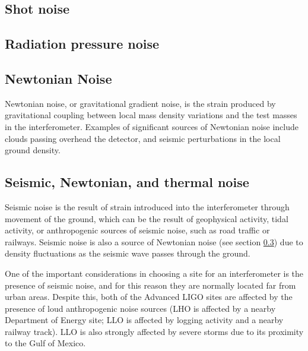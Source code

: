 
\subsection{Shot noise}
\label{sec:shot-noise}

\subsection{Radiation pressure noise}
\label{sec:radi-press-noise}


\subsection{Newtonian Noise}
\label{sec:newtonian-noise}

Newtonian noise, or gravitational gradient noise, is the strain
produced by gravitational coupling between local mass density
variations and the test masses in the interferometer. Examples of
significant sources of Newtonian noise include clouds passing overhead
the detector, and seismic perturbations in the local ground density.

\subsection{Seismic, Newtonian, and thermal noise}
\label{sec:seismic-noise}

Seismic noise is the result of strain introduced into the
interferometer through movement of the ground, which can be the result
of geophysical activity, tidal activity, or anthropogenic sources of
seismic noise, such as road traffic or railways. Seismic noise is also
a source of Newtonian noise (see section \ref{sec:newtonian-noise})
due to density fluctuations as the seismic wave passes through the
ground.

One of the important considerations in choosing a site for an
interferometer is the presence of seismic noise, and for this reason
they are normally located far from urban areas. Despite this, both of
the Advanced LIGO sites are affected by the presence of loud
anthropogenic noise sources (LHO is affected by a nearby Department of
Energy site; LLO is affected by logging activity and a nearby railway
track)\cite{2004CQGra..21.2255D}. LLO is also strongly affected by
severe storms due to its proximity to the Gulf of Mexico.

